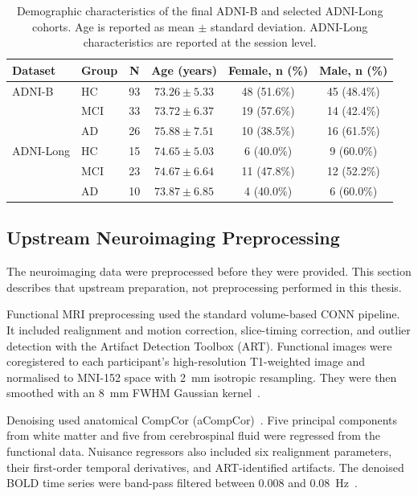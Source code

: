 \begin{table}[ht]
    \centering
    \caption{Demographic characteristics of the final ADNI-B and selected
    ADNI-Long cohorts. Age is reported as mean $\pm$ standard deviation.
    ADNI-Long characteristics are reported at the session level.}
    \label{tab:demographics}
    \begin{tabular}{llcccc}
        \hline
        Dataset & Group & N & Age (years) & Female, n (\%) & Male, n (\%) \\
        \hline
        ADNI-B
            & HC  & 93 & $73.26 \pm 5.33$ & 48 (51.6\%) & 45 (48.4\%) \\
            & MCI & 33 & $73.72 \pm 6.37$ & 19 (57.6\%) & 14 (42.4\%) \\
            & AD  & 26 & $75.88 \pm 7.51$ & 10 (38.5\%) & 16 (61.5\%) \\
        \hline
        ADNI-Long
            & HC  & 15 & $74.65 \pm 5.03$ & 6 (40.0\%) & 9 (60.0\%) \\
            & MCI & 23 & $74.67 \pm 6.64$ & 11 (47.8\%) & 12 (52.2\%) \\
            & AD  & 10 & $73.87 \pm 6.85$ & 4 (40.0\%) & 6 (60.0\%) \\
        \hline
    \end{tabular}
\end{table}

\subsection{Upstream Neuroimaging Preprocessing}
\label{sec:neuroimaging_preprocessing}

The neuroimaging data were preprocessed before they were provided.
This section describes that upstream preparation, not preprocessing
performed in this thesis.

Functional MRI preprocessing used the standard volume-based CONN
pipeline. It included realignment and motion correction, slice-timing
correction, and outlier detection with the Artifact Detection Toolbox
(ART). Functional images were coregistered to each participant's
high-resolution T1-weighted image and normalised to MNI-152 space with
2~mm isotropic resampling. They were then smoothed with an 8~mm FWHM
Gaussian kernel~\cite{AquileLlorensMartinezMolina}.

Denoising used anatomical CompCor (aCompCor)~\cite{Behzadi2007}. Five
principal components from white matter and five from cerebrospinal
fluid were regressed from the functional data. Nuisance regressors also
included six realignment parameters, their first-order temporal
derivatives, and ART-identified artifacts. The denoised BOLD time
series were band-pass filtered between 0.008 and
0.08~Hz~\cite{AquileLlorensMartinezMolina}.


